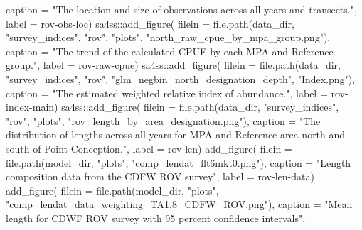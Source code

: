 \documentclass[
  letterpaper,
]{article}
\newenvironment{Shaded}{\begin{snugshade}}{\end{snugshade}}
\newcommand{\AttributeTok}[1]{\textcolor[rgb]{0.77,0.63,0.00}{#1}}
\newcommand{\FunctionTok}[1]{\textcolor[rgb]{0.00,0.00,0.00}{#1}}
\newcommand{\NormalTok}[1]{#1}
\newcommand{\SpecialCharTok}[1]{\textcolor[rgb]{0.00,0.00,0.00}{#1}}
\newcommand{\StringTok}[1]{\textcolor[rgb]{0.31,0.60,0.02}{#1}}
\begin{document}
\begin{Shaded}
\begin{Highlighting}[]
\AttributeTok{caption =} \StringTok{"The location and size of observations across all years and transects."}\NormalTok{,}
\AttributeTok{label =} \StringTok{\textquotesingle{}rov{-}obs{-}loc\textquotesingle{}}\NormalTok{)}
\NormalTok{sa4ss}\SpecialCharTok{::}\FunctionTok{add\_figure}\NormalTok{(}
\AttributeTok{filein =} \FunctionTok{file.path}\NormalTok{(data\_dir, }\StringTok{"survey\_indices"}\NormalTok{, }\StringTok{"rov"}\NormalTok{, }\StringTok{"plots"}\NormalTok{, }\StringTok{"north\_raw\_cpue\_by\_mpa\_group.png"}\NormalTok{), }
\AttributeTok{caption =} \StringTok{"The trend of the calculated CPUE by each MPA and Reference group."}\NormalTok{,}
\AttributeTok{label =} \StringTok{\textquotesingle{}rov{-}raw{-}cpue\textquotesingle{}}\NormalTok{)}
\NormalTok{sa4ss}\SpecialCharTok{::}\FunctionTok{add\_figure}\NormalTok{(}
\AttributeTok{filein =} \FunctionTok{file.path}\NormalTok{(data\_dir, }\StringTok{"survey\_indices"}\NormalTok{, }\StringTok{"rov"}\NormalTok{, }\StringTok{"glm\_negbin\_north\_designation\_depth"}\NormalTok{, }\StringTok{"Index.png"}\NormalTok{), }
\AttributeTok{caption =} \StringTok{"The estimated weighted relative index of abundance."}\NormalTok{,}
\AttributeTok{label =} \StringTok{\textquotesingle{}rov{-}index{-}main\textquotesingle{}}\NormalTok{)}
\NormalTok{sa4ss}\SpecialCharTok{::}\FunctionTok{add\_figure}\NormalTok{(}
\AttributeTok{filein =} \FunctionTok{file.path}\NormalTok{(data\_dir, }\StringTok{"survey\_indices"}\NormalTok{, }\StringTok{"rov"}\NormalTok{, }\StringTok{"plots"}\NormalTok{, }\StringTok{"rov\_length\_by\_area\_designation.png"}\NormalTok{), }
\AttributeTok{caption =} \StringTok{"The distribution of lengths across all years for MPA and Reference area north and south of Point Conception."}\NormalTok{,}
\AttributeTok{label =} \StringTok{\textquotesingle{}rov{-}len\textquotesingle{}}\NormalTok{)}
\FunctionTok{add\_figure}\NormalTok{(}
\AttributeTok{filein =} \FunctionTok{file.path}\NormalTok{(model\_dir, }\StringTok{"plots"}\NormalTok{, }\StringTok{"comp\_lendat\_flt6mkt0.png"}\NormalTok{), }
\AttributeTok{caption =} \StringTok{"Length composition data from the CDFW ROV survey"}\NormalTok{,}
\AttributeTok{label =} \StringTok{\textquotesingle{}rov{-}len{-}data\textquotesingle{}}\NormalTok{)}
\FunctionTok{add\_figure}\NormalTok{(}
\AttributeTok{filein =} \FunctionTok{file.path}\NormalTok{(model\_dir, }\StringTok{"plots"}\NormalTok{, }\StringTok{"comp\_lendat\_data\_weighting\_TA1.8\_CDFW\_ROV.png"}\NormalTok{), }
\AttributeTok{caption =} \StringTok{"Mean length for CDWF ROV survey with 95 percent confidence intervals"}\NormalTok{,}

\end{Highlighting}
\end{Shaded}
\end{document}
